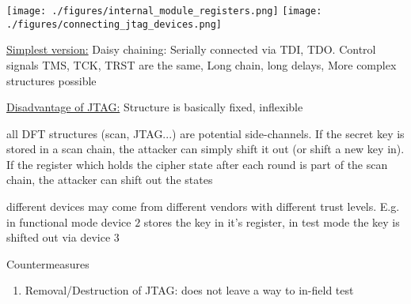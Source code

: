 \documentclass[landscape, a4paper]{article}
\begin{document}
\begin{minipage}[t]{0.2\linewidth}
	\begin{betterlist}
		\item
		\texttt{[image: ./figures/internal\_module\_registers.png]}
		\texttt{[image: ./figures/connecting\_jtag\_devices.png]}
		\item \underline{Simplest version:} \alert{Daisy chaining:} Serially connected via TDI, TDO. Control signals TMS, TCK, TRST are the same, Long chain, long delays, More complex structures possible
		\item \underline{Disadvantage of JTAG:} Structure is basically fixed, inflexible
	\end{betterlist}
	\begin{betterlist}
		\item all DFT structures (scan, JTAG...) are potential side-channels. If the secret key is stored in a scan chain, the attacker can simply shift it out (or shift a new key in). If the register which holds the cipher state after each round is part of the scan chain, the attacker can shift out the states
		\begin{betterlist}
			\item different devices may come from different vendors with different trust levels. E.g. in functional mode device $2$ stores the key in it's register, in test mode the key is shifted out via device $3$
		\end{betterlist}
		\item \alert{Countermeasures}
		\begin{enumerate}
			\item \alert{Removal/Destruction of JTAG:} does not leave a way to in-field test
\end{enumerate}
\end{betterlist}
\end{minipage}
\end{document}
